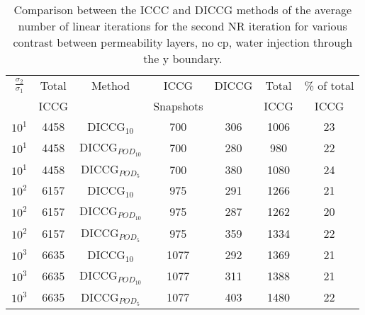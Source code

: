 \documentclass[a4paper,10pt]{report}
\begin{document}
\begin{table}[!ht]\centering
\begin{minipage}{1\textwidth}
 \centering
\begin{tabular}{ ||c|c||c|c|c|c|c||} 
\hline
$\frac{\sigma_2}{\sigma_1}$&Total&Method  & ICCG&DICCG &Total&\% of total\\ 
                           & ICCG     &  & Snapshots& &ICCG& ICCG\\ 
\hline 
$10^{1}$ &4458& DICCG$_{10}$&700&306&1006&23\\ 
\hline  
$10^{1}$ &4458& DICCG$_{POD_{10}}$&700&280&980&22 \\ 
\hline  
$10^{1}$ &4458& DICCG$_{POD_{5}}$&700&380&1080&24 \\ 
\hline 

$10^{2}$ &6157& DICCG$_{10}$&975&291&1266&21\\ 
\hline  
$10^{2}$ &6157& DICCG$_{POD_{10}}$&975&287&1262&20 \\ 
\hline  
$10^{2}$ &6157& DICCG$_{POD_{5}}$&975&359&1334&22 \\ 
\hline 
$10^{3}$ &6635& DICCG$_{10}$&1077&292&1369&21\\ 
\hline  
$10^{3}$ &6635& DICCG$_{POD_{10}}$&1077&311&1388&21 \\ 
\hline  
$10^{3}$ &6635& DICCG$_{POD_{5}}$&1077&403&1480&22 \\ 
\hline 
\end{tabular} 
\caption{Comparison between the ICCC and DICCG methods of the average number of linear iterations for the second NR iteration for various contrast between permeability layers, no cp, water injection through the y boundary. }\label{table:litertot2} 
\end{minipage}  
\end{table}  
\end{document}
